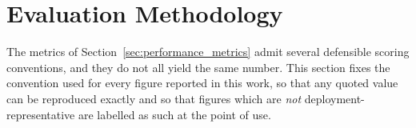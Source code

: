 \documentclass[12pt, a4paper]{report}
\begin{document}
{{%

\section{Evaluation Methodology}
\label{sec:eval_methodology}

The metrics of Section~\ref{sec:performance_metrics} admit several defensible
scoring conventions, and they do not all yield the same number. This section
fixes the convention used for every figure reported in this work, so that any
quoted value can be reproduced exactly and so that figures which are
\emph{not} deployment-representative are labelled as such at the point of use.

}}
\end{document}

